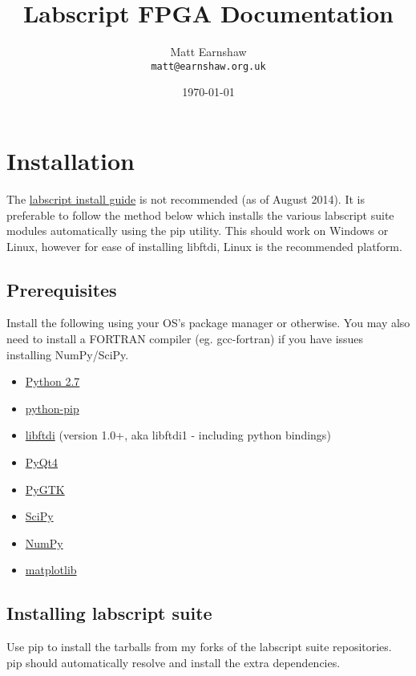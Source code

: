 \documentclass[11pt,a4paper]{article}
\begin{document}
\title{Labscript FPGA Documentation}
\author{Matt Earnshaw \\ \texttt{matt@earnshaw.org.uk}}
\date{\mydate\today}
\maketitle

\tableofcontents 
\newpage

\section{Installation}
The \href{https://bitbucket.org/labscript_suite/install-guide/src}{labscript install guide} is not recommended (as of August 2014). It is preferable to follow the method below which installs the various labscript suite modules automatically using the pip utility. This should work on Windows or Linux, however for ease of installing libftdi, Linux is the recommended platform.

\subsection{Prerequisites}
Install the following using your OS's package manager or otherwise. You may also need to install a FORTRAN compiler (eg. gcc-fortran) if you have issues installing NumPy/SciPy.

\begin{itemize}
\itemsep1pt\parskip0pt
\item \href{http://www.python.org}{Python 2.7}
\item \href{https://pypi.python.org/pypi/pip}{python-pip}
\item \href{http://www.intra2net.com/en/developer/libftdi/}{libftdi} (version 1.0+, aka libftdi1 - including python bindings)
\item \href{http://www.riverbankcomputing.co.uk/software/pyqt/download}{PyQt4}
\item \href{http://www.pygtk.org/}{PyGTK}
\item \href{http://www.scipy.org}{SciPy}
\item \href{http://www.numpy.org}{NumPy}
\item \href{http://www.matplotlib.org}{matplotlib}
\end{itemize}


\subsection{Installing labscript suite}
Use pip to install the tarballs from my forks of the labscript suite repositories. pip should automatically resolve and install the extra dependencies. 
\end{document}
